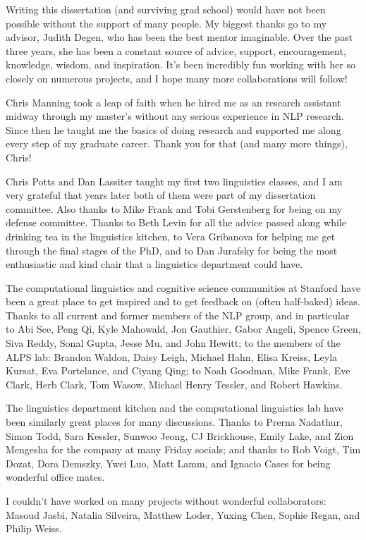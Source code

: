 Writing this dissertation (and surviving grad school) would have not been possible without the support of many people. My biggest thanks go to my advisor, Judith Degen, who has been the best mentor imaginable. Over the past three years, she has been a constant source of advice, support, encouragement, knowledge, wisdom, and inspiration. It's been incredibly fun working with her so closely on numerous projects, and I hope many more collaborations will follow!

Chris Manning took a leap of faith when he hired me as an research assistant midway through my master's without any serious experience in NLP research. Since then he taught me the basics of doing research and supported me along every step of my graduate career. Thank you for that (and many more things), Chris!

Chris Potts and Dan Lassiter taught my first two linguistics classes, and I am very grateful that years later both of them were part of my dissertation committee. Also thanks to Mike Frank and Tobi Gerstenberg for being on my defense committee. Thanks to Beth Levin for all the advice passed along while drinking tea in the linguistics kitchen, to Vera Gribanova for helping me get through the final stages of the PhD, and to Dan Jurafsky for being the most enthusiastic and kind chair that a linguistics department could have.

The computational linguistics and cognitive science communities at Stanford have been a great place to get inspired and to get feedback on (often half-baked) ideas. Thanks to all current and former members of the NLP group, and in particular to Abi See, Peng Qi, Kyle Mahowald, Jon Gauthier, Gabor Angeli, Spence Green, Siva Reddy, Sonal Gupta, Jesse Mu, and John Hewitt; to the members of the ALPS lab: Brandon Waldon, Daisy Leigh, Michael Hahn, Elisa Kreiss, Leyla Kursat, Eva Portelance, and Ciyang Qing; to Noah Goodman, Mike Frank, Eve Clark, Herb Clark, Tom Wasow, Michael Henry Tessler, and Robert Hawkins.

The linguistics department kitchen and the computational linguistics lab have been similarly great places for many discussions. Thanks to Prerna Nadathur, Simon Todd, Sara Kessler, Sunwoo Jeong, CJ Brickhouse, Emily Lake, and Zion Mengesha for the company at many Friday socials; and thanks to Rob Voigt, Tim Dozat, Dora Demszky, Ywei Luo, Matt Lamm, and Ignacio Cases for being wonderful office mates.

I couldn't have worked on many projects without wonderful collaborators: Masoud Jasbi, Natalia Silveira, Matthew Loder, Yuxing Chen, Sophie Regan, and Philip Weiss.


